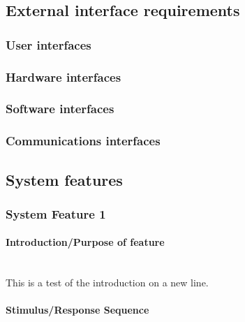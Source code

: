 \documentclass[compsoc,draftclsnofoot,onecolumn,10pt]{IEEEtran}
\begin{document}
\subsection{External interface requirements}
	\subsubsection{User interfaces}
	\subsubsection{Hardware interfaces}
	\subsubsection{Software interfaces}
	\subsubsection{Communications interfaces}

\subsection{System features}

\subsubsection{System Feature 1}

\paragraph{Introduction/Purpose of feature}~\\
This is a test of the introduction on a new line.

\paragraph{Stimulus/Response Sequence} 
\end{document}
